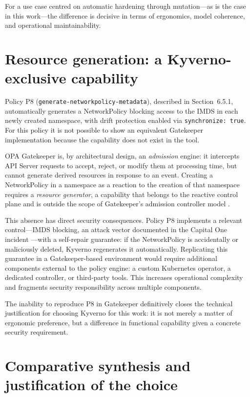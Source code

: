 For a use case centred on automatic hardening through mutation---as is the case in this work---the difference is decisive in terms of ergonomics, model coherence, and operational maintainability.

\section{Resource generation: a Kyverno-exclusive capability}

Policy P8 (\texttt{generate-networkpolicy-metadata}), described in Section~6.5.1, automatically generates a NetworkPolicy blocking access to the IMDS in each newly created namespace, with drift protection enabled via \texttt{synchronize:\,true}. For this policy it is not possible to show an equivalent Gatekeeper implementation because the capability does not exist in the tool.

OPA Gatekeeper is, by architectural design, an \textit{admission} engine: it intercepts API Server requests to accept, reject, or modify them at processing time, but cannot generate derived resources in response to an event. Creating a NetworkPolicy in a namespace as a reaction to the creation of that namespace requires a \textit{resource generator}, a capability that belongs to the reactive control plane and is outside the scope of Gatekeeper's admission controller model \cite{gatekeeper_docs}.

This absence has direct security consequences. Policy P8 implements a relevant control---IMDS blocking, an attack vector documented in the Capital One incident \cite{capitalone2019}---with a self-repair guarantee: if the NetworkPolicy is accidentally or maliciously deleted, Kyverno regenerates it automatically. Replicating this guarantee in a Gatekeeper-based environment would require additional components external to the policy engine: a custom Kubernetes operator, a dedicated controller, or third-party tools. This increases operational complexity and fragments security responsibility across multiple components.

The inability to reproduce P8 in Gatekeeper definitively closes the technical justification for choosing Kyverno for this work: it is not merely a matter of ergonomic preference, but a difference in functional capability given a concrete security requirement.

\section{Comparative synthesis and justification of the choice}

